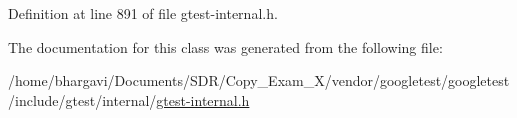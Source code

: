 Definition at line 891 of file gtest-\/internal.\+h.



The documentation for this class was generated from the following file\+:\begin{DoxyCompactItemize}
\item 
/home/bhargavi/\+Documents/\+S\+D\+R/\+Copy\+\_\+\+Exam\+\_\+X/vendor/googletest/googletest/include/gtest/internal/\hyperlink{gtest-internal_8h}{gtest-\/internal.\+h}\end{DoxyCompactItemize}
